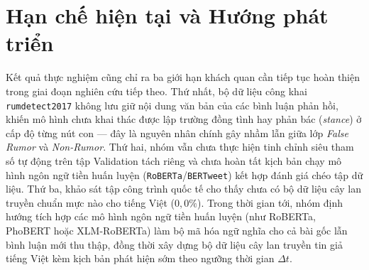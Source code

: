 \documentclass[11pt,a4paper]{extreport}
\begin{document}
\section{Hạn chế hiện tại và Hướng phát triển}

Kết quả thực nghiệm cũng chỉ ra ba giới hạn khách quan cần tiếp tục hoàn thiện trong giai đoạn nghiên cứu tiếp theo. Thứ nhất, bộ dữ liệu công khai \texttt{rumdetect2017} không lưu giữ nội dung văn bản của các bình luận phản hồi, khiến mô hình chưa khai thác được lập trường đồng tình hay phản bác (\textit{stance}) ở cấp độ từng nút con --- đây là nguyên nhân chính gây nhầm lẫn giữa lớp \textit{False Rumor} và \textit{Non-Rumor}. Thứ hai, nhóm vẫn chưa thực hiện tinh chỉnh siêu tham số tự động trên tập Validation tách riêng và chưa hoàn tất kịch bản chạy mô hình ngôn ngữ tiền huấn luyện (\texttt{RoBERTa}/\texttt{BERTweet}) kết hợp đánh giá chéo tập dữ liệu. Thứ ba, khảo sát tập công trình quốc tế cho thấy chưa có bộ dữ liệu cây lan truyền chuẩn mực nào cho tiếng Việt ($0{,}0\%$). Trong thời gian tới, nhóm định hướng tích hợp các mô hình ngôn ngữ tiền huấn luyện (như RoBERTa, PhoBERT hoặc XLM-RoBERTa) làm bộ mã hóa ngữ nghĩa cho cả bài gốc lẫn bình luận mới thu thập, đồng thời xây dựng bộ dữ liệu cây lan truyền tin giả tiếng Việt kèm kịch bản phát hiện sớm theo ngưỡng thời gian $\Delta t$.


\newpage


\end{document}
